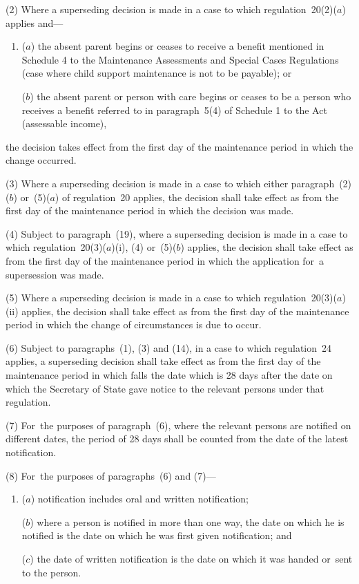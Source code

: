 \documentclass[a4paper,12pt]{article}
\begin{document}
(2) Where a superseding decision is made in a case to which regulation~20(2)($a$)  applies and—
\begin{enumerate}\item[]
($a$) the absent parent begins or ceases to receive a benefit mentioned in Schedule 4 to the Maintenance Assessments and Special Cases Regulations (case where child support maintenance is not to be payable); or

($b$) the absent parent or person with care begins or ceases to be a person who receives a benefit referred to in paragraph~5(4) of Schedule 1 to the Act (assessable income),
\end{enumerate}
the decision takes effect from the first day of the maintenance period in which the change occurred.

(3) Where a superseding decision is made in a case to which either paragraph~(2)($b$) or~(5)($a$) of regulation~20 applies, the decision shall take effect as from the first day of the maintenance period in which the decision was made.

(4) 
Subject to paragraph~(19), where a superseding decision is made  %
in a case to which regulation~20(3)($a$)(i), (4) or~(5)($b$) applies, the decision shall take effect as from the first day of the maintenance period in which the application for~a supersession was made.

(5) Where a superseding decision is made in a case to which regulation~20(3)($a$)(ii) applies, the decision shall take effect as from the first day of the maintenance period in which the change of circumstances is due to occur.

(6) Subject to paragraphs~(1), (3) and (14), in a case to which regulation~24 applies, a superseding decision shall take effect as from the first day of the maintenance period in which falls the date which is 28 days after the date on which the Secretary of State gave notice to the relevant persons under that regulation.

(7) For~the purposes of paragraph~(6), where the relevant persons are notified on different dates, the period of 28 days shall be counted from the date of the latest notification.

(8) For~the purposes of paragraphs~(6) and (7)---
\begin{enumerate}\item[]
($a$) notification includes oral and written notification;

($b$) where a person is notified in more than one way, the date on which he is notified is the date on which he was first given notification; and

($c$) the date of written notification is the date on which it was handed or~sent to the person.
\end{enumerate}
\end{document}
